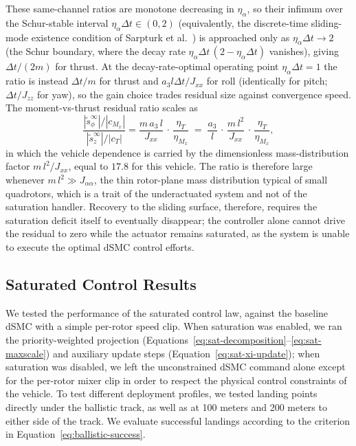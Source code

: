 \documentclass[conf]{new-aiaa}
\begin{document}
These same-channel ratios are monotone decreasing in $\eta_\alpha$, so their infimum over the Schur-stable interval $\eta_\alpha \Delta t \in (0,2)$ (equivalently, the discrete-time sliding-mode existence condition of Sarpturk et al.\ \cite{refs:Sarpturk1987}) is approached only as $\eta_\alpha \Delta t \to 2$ (the Schur boundary, where the decay rate $\eta_\alpha \Delta t\,(2 - \eta_\alpha \Delta t)$ vanishes), giving $\Delta t/(2m)$ for thrust. At the decay-rate-optimal operating point $\eta_\alpha \Delta t = 1$ the ratio is instead $\Delta t/m$ for thrust and $a_3 l \Delta t/J_{xx}$ for roll (identically for pitch; $\Delta t/J_{zz}$ for yaw), so the gain choice trades residual size against convergence speed. The moment-vs-thrust residual ratio scales as
\begin{equation}
\label{eq:sat-residual-ratio}
\frac{|\tilde s_\phi^\infty|/|c_{M_x}|}{|\tilde s_z^\infty|/|c_T|} = \frac{m\, a_3\, l}{J_{xx}}\, \cdot\, \frac{\eta_T}{\eta_{M_x}}
\;=\; \frac{a_3}{l}\, \cdot\, \frac{m\, l^2}{J_{xx}}\, \cdot\, \frac{\eta_T}{\eta_{M_x}},
\end{equation}
in which the vehicle dependence is carried by the dimensionless mass-distribution factor $m\, l^2 / J_{xx}$, equal to $17.8$ for this vehicle. The ratio is therefore large whenever $m\, l^2 \gg J_{\alpha\alpha}$, the thin rotor-plane mass distribution typical of small quadrotors, which is a trait of the underactuated system and not of the saturation handler. Recovery to the sliding surface, therefore, requires the saturation deficit itself to eventually disappear; the controller alone cannot drive the residual to zero while the actuator remains saturated, as the system is unable to execute the optimal dSMC control efforts.

\subsection{Saturated Control Results}
\label{sec:sat-validation}

We tested the performance of the saturated control law, against the baseline dSMC with a simple per-rotor speed clip. When saturation was enabled, we ran the priority-weighted projection (Equations~\ref{eq:sat-decomposition}–\ref{eq:sat-maxscale}) and auxiliary update steps (Equation~\ref{eq:sat-xi-update}); when saturation was disabled, we left the unconstrained dSMC command alone except for the per-rotor mixer clip in order to respect the physical control constraints of the vehicle. To test different deployment profiles, we tested landing points directly under the ballistic track, as well as at 100 meters and 200 meters to either side of the track. We evaluate successful landings according to the criterion in Equation~\ref{eq:ballistic-success}.
\end{document}
